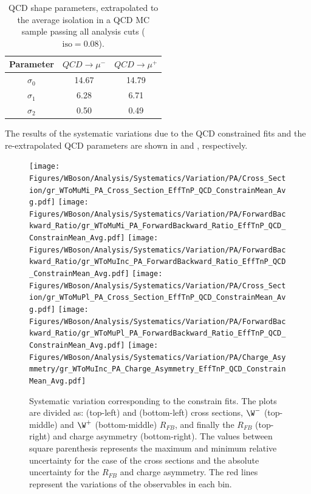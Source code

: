 \begin{table}[!htbp]
  \begin{center}
  \begin{tabular}{|c|c|c|}\hline
  Parameter & $QCD \to \mu^{-}$ & $QCD \to \mu^{+}$ \\\hline
  $\sigma_{0}$ & 14.67 & 14.79 \\\hline
  $\sigma_{1}$ & 6.28 & 6.71 \\\hline
  $\sigma_{2}$ & 0.50 & 0.49 \\\hline
  \end{tabular}
  \end{center}
  \caption{QCD shape parameters, extrapolated to the average isolation in a QCD MC sample passing all analysis cuts ($\text{iso} = 0.08$).}
  \label{tab:QCDFixedPar_Iso0p08}
\end{table}

The results of the systematic variations due to the QCD constrained fits and the re-extrapolated QCD parameters are shown in  and , respectively.

\begin{figure}[htbp]
 \begin{center}
  \texttt{[image: Figures/WBoson/Analysis/Systematics/Variation/PA/Cross\_Section/gr\_WToMuMi\_PA\_Cross\_Section\_EffTnP\_QCD\_ConstrainMean\_Avg.pdf]}
  \texttt{[image: Figures/WBoson/Analysis/Systematics/Variation/PA/ForwardBackward\_Ratio/gr\_WToMuMi\_PA\_ForwardBackward\_Ratio\_EffTnP\_QCD\_ConstrainMean\_Avg.pdf]}
  \texttt{[image: Figures/WBoson/Analysis/Systematics/Variation/PA/ForwardBackward\_Ratio/gr\_WToMuInc\_PA\_ForwardBackward\_Ratio\_EffTnP\_QCD\_ConstrainMean\_Avg.pdf]}
  \texttt{[image: Figures/WBoson/Analysis/Systematics/Variation/PA/Cross\_Section/gr\_WToMuPl\_PA\_Cross\_Section\_EffTnP\_QCD\_ConstrainMean\_Avg.pdf]}
  \texttt{[image: Figures/WBoson/Analysis/Systematics/Variation/PA/ForwardBackward\_Ratio/gr\_WToMuPl\_PA\_ForwardBackward\_Ratio\_EffTnP\_QCD\_ConstrainMean\_Avg.pdf]}
  \texttt{[image: Figures/WBoson/Analysis/Systematics/Variation/PA/Charge\_Asymmetry/gr\_WToMuInc\_PA\_Charge\_Asymmetry\_EffTnP\_QCD\_ConstrainMean\_Avg.pdf]}
 \end{center}
 \caption{Systematic variation corresponding to the constrain fits. The plots are divided as: \WToMuNuMi (top-left) and \WToMuNuPl (bottom-left) cross sections, $\W^{-}$ (top-middle) and $\W^{+}$ (bottom-middle) $R_{FB}$, and finally the \W $R_{FB}$ (top-right) and \W charge asymmetry (bottom-right). The values between square parenthesis represents the maximum and minimum relative uncertainty for the case of the cross sections and the absolute uncertainty for the $R_{FB}$ and charge asymmetry. The red lines represent the variations of the observables in each bin.}
 \label{fig:Systematic_QCD_ConstrainMean}
\end{figure}

